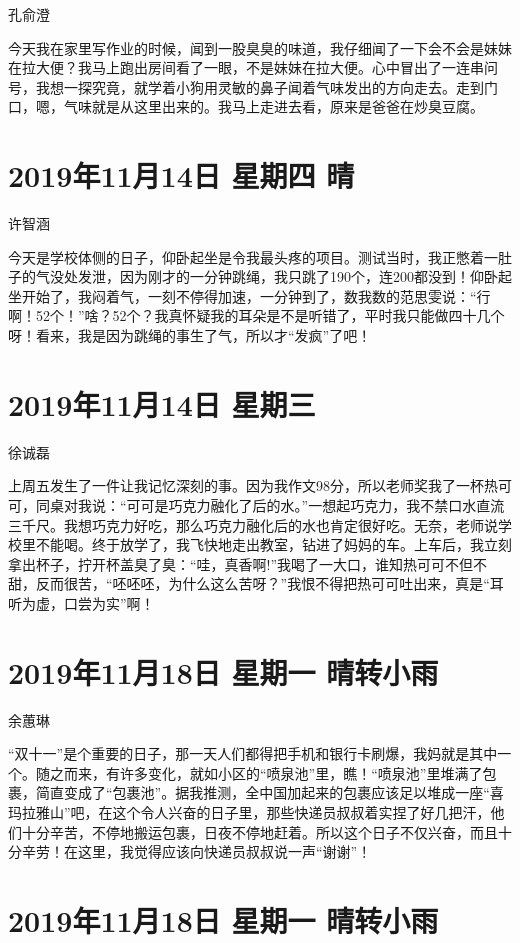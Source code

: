孔俞澄

今天我在家里写作业的时候，闻到一股臭臭的味道，我仔细闻了一下会不会是妹妹在拉大便？我马上跑出房间看了一眼，不是妹妹在拉大便。心中冒出了一连串问号，我想一探究竟，就学着小狗用灵敏的鼻子闻着气味发出的方向走去。走到门口，嗯，气味就是从这里出来的。我马上走进去看，原来是爸爸在炒臭豆腐。

\section{2019年11月14日 星期四 晴}

许智涵

今天是学校体侧的日子，仰卧起坐是令我最头疼的项目。测试当时，我正憋着一肚子的气没处发泄，因为刚才的一分钟跳绳，我只跳了190个，连200都没到！仰卧起坐开始了，我闷着气，一刻不停得加速，一分钟到了，数我数的范思雯说：``行啊！52个！''啥？52个？我真怀疑我的耳朵是不是听错了，平时我只能做四十几个呀！看来，我是因为跳绳的事生了气，所以才``发疯''了吧！

\section{2019年11月14日 星期三}

徐诚磊

上周五发生了一件让我记忆深刻的事。因为我作文98分，所以老师奖我了一杯热可可，同桌对我说：``可可是巧克力融化了后的水。''一想起巧克力，我不禁口水直流三千尺。我想巧克力好吃，那么巧克力融化后的水也肯定很好吃。无奈，老师说学校里不能喝。终于放学了，我飞快地走出教室，钻进了妈妈的车。上车后，我立刻拿出杯子，拧开杯盖臭了臭：``哇，真香啊!''我喝了一大口，谁知热可可不但不甜，反而很苦，``呸呸呸，为什么这么苦呀？''我恨不得把热可可吐出来，真是``耳听为虚，口尝为实''啊！

\section{2019年11月18日 星期一 晴转小雨}

余蕙琳

``双十一''是个重要的日子，那一天人们都得把手机和银行卡刷爆，我妈就是其中一个。随之而来，有许多变化，就如小区的``喷泉池''里，瞧！``喷泉池''里堆满了包裹，简直变成了``包裹池''。据我推测，全中国加起来的包裹应该足以堆成一座``喜玛拉雅山''吧，在这个令人兴奋的日子里，那些快递员叔叔着实捏了好几把汗，他们十分辛苦，不停地搬运包裹，日夜不停地赶着。所以这个日子不仅兴奋，而且十分辛劳！在这里，我觉得应该向快递员叔叔说一声``谢谢''！

\section{2019年11月18日 星期一 晴转小雨}

